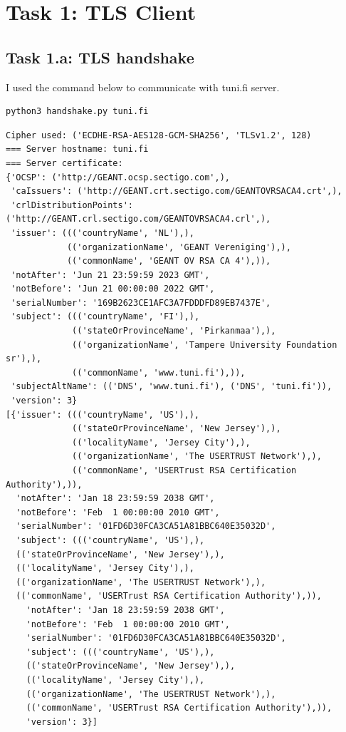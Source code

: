 \section{Task 1: TLS Client}
\subsection{Task 1.a: TLS handshake}
%
I used the command below to communicate with {\selectfont tuni.fi}
server.

\begin{lstlisting}[language=bash]
    python3 handshake.py tuni.fi
\end{lstlisting}

\begin{lstlisting}[caption=TLS Hanshake negotiation aand certificate log,
    label={lst:handshake_log}]
Cipher used: ('ECDHE-RSA-AES128-GCM-SHA256', 'TLSv1.2', 128)
=== Server hostname: tuni.fi
=== Server certificate:
{'OCSP': ('http://GEANT.ocsp.sectigo.com',),
 'caIssuers': ('http://GEANT.crt.sectigo.com/GEANTOVRSACA4.crt',),
 'crlDistributionPoints': ('http://GEANT.crl.sectigo.com/GEANTOVRSACA4.crl',),
 'issuer': ((('countryName', 'NL'),),
            (('organizationName', 'GEANT Vereniging'),),
            (('commonName', 'GEANT OV RSA CA 4'),)),
 'notAfter': 'Jun 21 23:59:59 2023 GMT',
 'notBefore': 'Jun 21 00:00:00 2022 GMT',
 'serialNumber': '169B2623CE1AFC3A7FDDDFD89EB7437E',
 'subject': ((('countryName', 'FI'),),
             (('stateOrProvinceName', 'Pirkanmaa'),),
             (('organizationName', 'Tampere University Foundation sr'),),
             (('commonName', 'www.tuni.fi'),)),
 'subjectAltName': (('DNS', 'www.tuni.fi'), ('DNS', 'tuni.fi')),
 'version': 3}
[{'issuer': ((('countryName', 'US'),),
             (('stateOrProvinceName', 'New Jersey'),),
             (('localityName', 'Jersey City'),),
             (('organizationName', 'The USERTRUST Network'),),
             (('commonName', 'USERTrust RSA Certification Authority'),)),
  'notAfter': 'Jan 18 23:59:59 2038 GMT',
  'notBefore': 'Feb  1 00:00:00 2010 GMT',
  'serialNumber': '01FD6D30FCA3CA51A81BBC640E35032D',
  'subject': ((('countryName', 'US'),),
  (('stateOrProvinceName', 'New Jersey'),),
  (('localityName', 'Jersey City'),),
  (('organizationName', 'The USERTRUST Network'),),
  (('commonName', 'USERTrust RSA Certification Authority'),)),
    'notAfter': 'Jan 18 23:59:59 2038 GMT',
    'notBefore': 'Feb  1 00:00:00 2010 GMT',
    'serialNumber': '01FD6D30FCA3CA51A81BBC640E35032D',
    'subject': ((('countryName', 'US'),),
    (('stateOrProvinceName', 'New Jersey'),),
    (('localityName', 'Jersey City'),),
    (('organizationName', 'The USERTRUST Network'),),
    (('commonName', 'USERTrust RSA Certification Authority'),)),
    'version': 3}]
\end{lstlisting}

